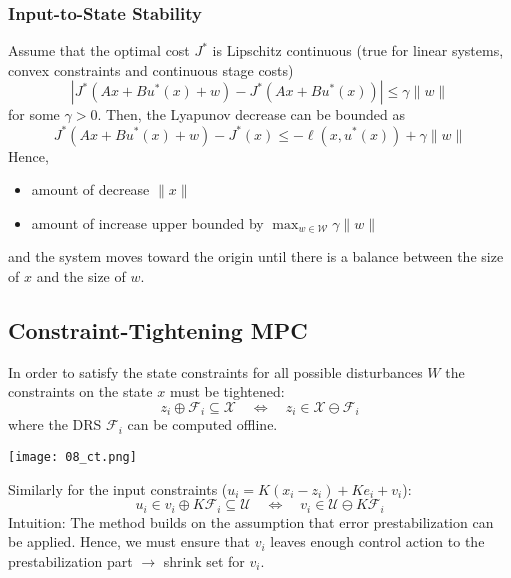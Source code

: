 \subsubsection{Input-to-State Stability}
Assume that the optimal cost $J^*$ is Lipschitz continuous (true for linear systems, convex constraints and continuous stage costs)
\begin{equation*}
    |J^*(A x + B u^*(x) + w) - J^*(A x + B u^*(x))| \leq \gamma \|w\|
\end{equation*}
for some $\gamma > 0$.
\newpar{}
Then, the Lyapunov decrease can be bounded as
\begin{equation*}
    J^*(A x + B u^*(x) + w) - J^*(x)\leq -\ell(x, u^*(x)) + \gamma \|w\|
\end{equation*}
Hence,
\begin{itemize}
    \item amount of decrease $\|x\|$
    \item amount of increase upper bounded by $\max_{w \in \mathcal{W}} \gamma \|w\|$
\end{itemize}
and the system moves toward the origin until there is a balance between the size of $x$ and the size of $w$.

\subsection{Constraint-Tightening MPC}

In order to satisfy the state constraints for all possible disturbances $W$ the constraints on the state $x$ must be tightened:
\begin{equation*}
    z_i \oplus \mathcal{F}_i \subseteq \mathcal{X} \quad \Leftrightarrow \quad z_i \in \mathcal{X}\ominus \mathcal{F}_i
\end{equation*}
where the DRS $\mathcal{F}_i$ can be computed offline.

\begin{center}
    \texttt{[image: 08\_ct.png]}
\end{center}

\newpar{}
Similarly for the input constraints ($u_i = K(x_i - z_i) + K e_i + v_i$): %
\begin{equation*}
    u_i \in v_i \oplus K \mathcal{F}_i \subseteq \mathcal{U}\quad \Leftrightarrow \quad v_i \in \mathcal{U} \ominus K\mathcal{F}_i
\end{equation*}
Intuition: The method builds on the assumption that error prestabilization can be applied. Hence, we must ensure that $v_i$ leaves enough control action to the prestabilization part $\rightarrow$ shrink set for $v_i$.


